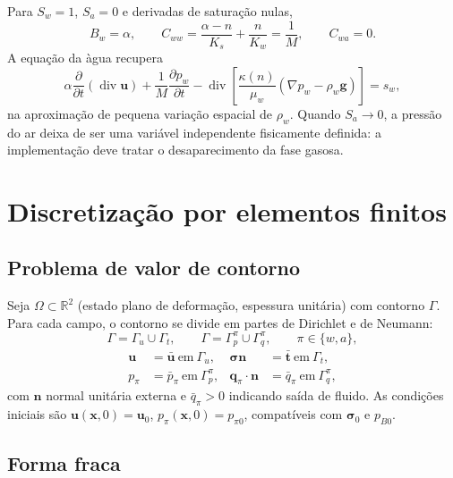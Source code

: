 \documentclass[11pt,a4paper]{article}
\numberwithin{equation}{section}
\newcommand{\Div}{\operatorname{div}}
\begin{document}
Para $S_w=1$, $S_a=0$ e derivadas de satura\c{c}\~ao nulas,
\begin{equation}
B_w=\alpha,\qquad
C_{ww}=\frac{\alpha-n}{K_s}+\frac{n}{K_w}=\frac1M,\qquad
C_{wa}=0.
\end{equation}
A equa\c{c}\~ao da \`agua recupera
\begin{equation}
\boxed{\alpha\frac{\partial}{\partial t}(\Div\mathbf u)
+\frac1M\frac{\partial p_w}{\partial t}
-\Div\left[\frac{\kappa(n)}{\mu_w}
(\nabla p_w-\rho_w\mathbf g)\right]=s_w,}
\end{equation}
na aproxima\c{c}\~ao de pequena varia\c{c}\~ao espacial de
$\rho_w$. Quando $S_a\to0$, a press\~ao do ar deixa de ser uma vari\'avel
independente fisicamente definida: a implementa\c{c}\~ao deve tratar
o desaparecimento da fase gasosa.

\section{Discretização por elementos finitos}

\subsection{Problema de valor de contorno}

Seja $\Omega\subset\mathbb R^{2}$ (estado plano de deformação, espessura
unitária) com contorno $\Gamma$. Para cada campo, o contorno se divide em
partes de Dirichlet e de Neumann:
\begin{equation}
\Gamma=\Gamma_u\cup\Gamma_t,\qquad
\Gamma=\Gamma_p^{\pi}\cup\Gamma_q^{\pi},\qquad \pi\in\{w,a\},
\end{equation}
\begin{equation}
\boxed{\begin{aligned}
\mathbf u&=\bar{\mathbf u}\ \text{em}\ \Gamma_u, &
\boldsymbol\sigma\mathbf n&=\bar{\mathbf t}\ \text{em}\ \Gamma_t,\\
p_\pi&=\bar p_\pi\ \text{em}\ \Gamma_p^{\pi}, &
\mathbf q_\pi\cdot\mathbf n&=\bar q_\pi\ \text{em}\ \Gamma_q^{\pi},
\end{aligned}}
\end{equation}
com $\mathbf n$ normal unitária externa e $\bar q_\pi>0$ indicando saída
de fluido. As condições iniciais são $\mathbf u(\mathbf x,0)=\mathbf u_0$,
$p_\pi(\mathbf x,0)=p_{\pi0}$, compatíveis com $\boldsymbol\sigma_0$ e
$p_{B0}$.

\subsection{Forma fraca}
\end{document}
